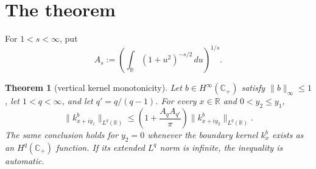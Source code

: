\documentclass[11pt]{article}
\newtheorem{theorem}{Theorem}
\newcommand{\Cplus}{\mathbb C_+}
\newcommand{\R}{\mathbb R}
\begin{document}
\section{The theorem}

For $1<s<\infty$, put
\[
 A_s:=\left(\int_{\R}(1+u^2)^{-s/2}\,du\right)^{1/s}.
\]

\begin{theorem}[vertical kernel monotonicity]\label{thm:main}
Let $b\in H^\infty(\Cplus)$ satisfy $\lVert b\rVert_\infty\le1$, let
$1<q<\infty$, and let $q'=q/(q-1)$.  For every $x\in\R$ and
$0<y_2\le y_1$,
\begin{equation}\label{eq:main}
 \lVert k_{x+iy_1}^b\rVert_{L^q(\R)}
 \le
 \left(1+\frac{A_qA_{q'}}{\pi}\right)
 \lVert k_{x+iy_2}^b\rVert_{L^q(\R)}.
\end{equation}
The same conclusion holds for $y_2=0$ whenever the boundary kernel
$k_x^b$ exists as an $H^q(\Cplus)$ function.  If its extended $L^q$ norm is
infinite, the inequality is automatic.
\end{theorem}
\end{document}
